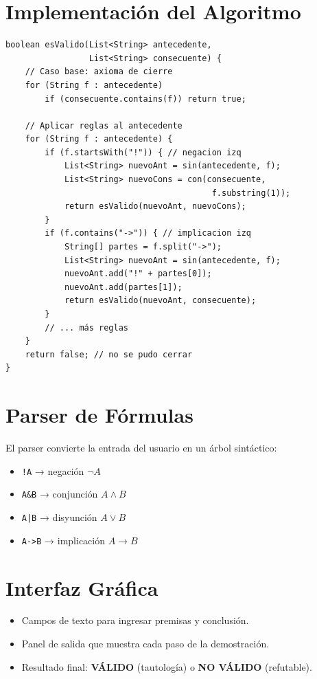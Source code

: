\documentclass[12pt,a4paper]{article}
\begin{document}
\section{Implementación del Algoritmo}

\begin{lstlisting}
boolean esValido(List<String> antecedente,
                 List<String> consecuente) {
    // Caso base: axioma de cierre
    for (String f : antecedente)
        if (consecuente.contains(f)) return true;

    // Aplicar reglas al antecedente
    for (String f : antecedente) {
        if (f.startsWith("!")) { // negacion izq
            List<String> nuevoAnt = sin(antecedente, f);
            List<String> nuevoCons = con(consecuente,
                                          f.substring(1));
            return esValido(nuevoAnt, nuevoCons);
        }
        if (f.contains("->")) { // implicacion izq
            String[] partes = f.split("->");
            List<String> nuevoAnt = sin(antecedente, f);
            nuevoAnt.add("!" + partes[0]);
            nuevoAnt.add(partes[1]);
            return esValido(nuevoAnt, consecuente);
        }
        // ... más reglas
    }
    return false; // no se pudo cerrar
}
\end{lstlisting}

\section{Parser de Fórmulas}

El parser convierte la entrada del usuario en un árbol sintáctico:
\begin{itemize}
  \item \texttt{!A} → negación $\neg A$
  \item \texttt{A\&B} → conjunción $A \wedge B$
  \item \texttt{A|B} → disyunción $A \vee B$
  \item \texttt{A->B} → implicación $A \rightarrow B$
\end{itemize}

\section{Interfaz Gráfica}

\begin{itemize}
  \item Campos de texto para ingresar premisas y conclusión.
  \item Panel de salida que muestra cada paso de la demostración.
  \item Resultado final: \textbf{VÁLIDO} (tautología) o \textbf{NO VÁLIDO} (refutable).
\end{itemize}
\end{document}
